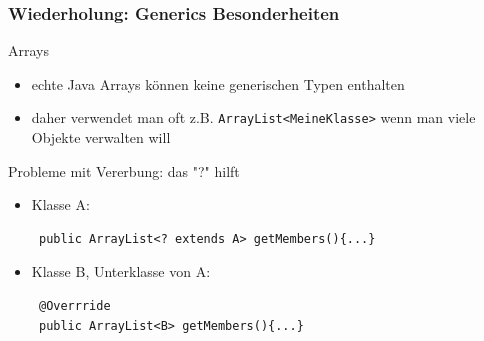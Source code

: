 \begin{frame}[fragile]
\frametitle{Wiederholung: Generics Besonderheiten}
	\begin{block}{Arrays}
	\begin{itemize}
	\item echte Java Arrays können keine generischen Typen enthalten \pause
	\item daher verwendet man oft z.B. \texttt{ArrayList<MeineKlasse>} wenn man viele Objekte verwalten will
	\end{itemize}
	\end{block}

	\pause
	\begin{block}{Probleme mit Vererbung: das "?" hilft} 
	\begin{itemize}
	\item Klasse A:
	\begin{lstlisting}
 public ArrayList<? extends A> getMembers(){...}
	\end{lstlisting}
\pause
	\item Klasse B, Unterklasse von A:
	\begin{lstlisting}
 @Overrride
 public ArrayList<B> getMembers(){...}
	\end{lstlisting}
	\end{itemize}
	\end{block}
\end{frame}






